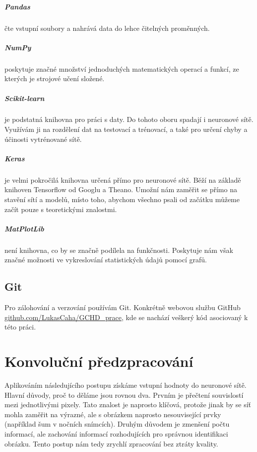 \documentclass[12pt,a4paper]{report}
\begin{document}
			\paragraph{Pandas}
			čte vstupní soubory a nahrává data do lehce čitelných proměnných.
			\paragraph{NumPy}
			poskytuje značné množství jednoduchých matematických operací a funkcí, ze kterých je strojové učení složené.
			\paragraph{Scikit-learn}
			je podstatná knihovna pro práci s daty. Do tohoto oboru spadají i neuronové sítě. Využívám ji na rozdělení dat na testovací a trénovací, a také pro určení chyby a účinosti vytrénované sítě.
			\paragraph{Keras}
			je velmi pokročilá knihovna určená přímo pro neuronové sítě. Běží na základě knihoven Tensorflow od Googlu a Theano. Umožní nám zaměřit se přímo na stavění sítí a modelů, místo toho, abychom všechno psali od začátku můžeme začít pouze s teoretickými znalostmi.
			\paragraph{MatPlotLib}
			není knihovna, co by se značně podílela na funkčnosti. Poskytuje nám však značné možnosti ve vykreslování statistických údajů pomocí grafů.
	\section{Git}
		Pro zálohování a verzování používám Git. Konkrétně webovou službu GitHub \url{github.com/LukasCaha/GCHD\_prace}, kde se nachází veškerý kód asociovaný k této práci.
		
\chapter{Konvoluční předzpracování}
	Aplikováním následujícího postupu získáme vstupní hodnoty do neuronové sítě. Hlavní důvody, proč to děláme jsou rovnou dva. Prvním je přečtení souvislostí mezi jednotlivými pixely. Tato znalost je naprosto klíčová, protože jinak by se síť mohla zaměřit na výrazné, ale s obrázkem naprosto nesouvisející prvky (například šum v nočních snímcích). Druhým důvodem je zmenšení počtu informací, ale zachování informací rozhodujících pro správnou identifikaci obrázku. Tento postup nám tedy zrychlí zpracování bez ztráty kvality.
\end{document}
